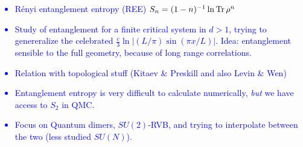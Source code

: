 \documentclass[11pt]{iopart}
\begin{document}

\textcolor{blue}{
\begin{itemize}
\item R\'enyi entanglement entropy (REE) $S_n=(1-n)^{-1}\ln {\rm Tr}\, \rho^n$
 \item Study of entanglement for a finite critical system in $d>1$, trying to genereralize the celebrated $\frac{c}{3}\ln\left| (L/\pi)\sin (\pi x /L)\right|$. Idea: entanglement sensible to the full geometry, because of long range correlations. 
 \item Relation with topological stuff (Kitaev \& Preskill\cite{KP} and also Levin \& Wen\cite{LW})
 \item Entanglement entropy is very difficult to calculate numerically, \emph{but} we have access to $S_2$ in QMC\cite{swap}.
 \item Focus on Quantum dimers, $SU(2)$-RVB, and trying to interpolate between the two (less studied $SU(N)$).
\end{itemize}
}
\end{document}
